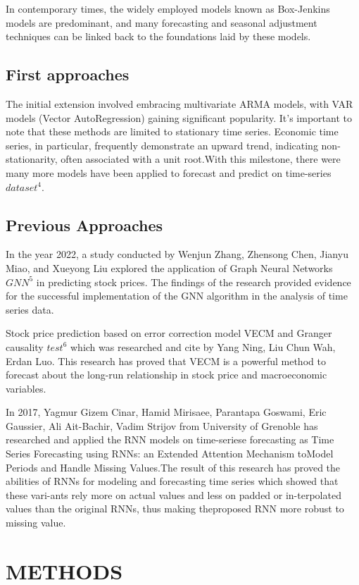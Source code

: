 \documentclass{ieeeojies}
\begin{document}
In contemporary times, the widely employed models known as Box-Jenkins models are predominant, and many forecasting and seasonal adjustment techniques can be linked back to the foundations laid by these models. 

\subsection{First approaches}
The initial extension involved embracing multivariate ARMA models, with VAR models (Vector AutoRegression) gaining significant popularity. It's important to note that these methods are limited to stationary time series. Economic time series, in particular, frequently demonstrate an upward trend, indicating non-stationarity, often associated with a unit root.With this milestone, there were many more models have been applied to forecast and predict on time-series $dataset^4$. 

\subsection{Previous Approaches}
In the year 2022, a study conducted by Wenjun Zhang, Zhensong Chen, Jianyu Miao, and Xueyong Liu explored the application of Graph Neural Networks $GNN^5$ in predicting stock prices. The findings of the research provided evidence for the successful implementation of the GNN algorithm in the analysis of time series data.

Stock price prediction based on error correction model VECM and Granger causality $test^6$ which was researched and cite by Yang Ning, Liu Chun Wah, Erdan Luo. This research has proved that VECM is a powerful method to forecast about the long-run relationship in stock price and macroeconomic variables.

In 2017, Yagmur Gizem Cinar, Hamid Mirisaee, Parantapa Goswami, Eric Gaussier, Ali Ait-Bachir, Vadim Strijov from University of Grenoble has researched and applied the RNN models on time-seriese forecasting as Time Series Forecasting using RNNs: an Extended Attention Mechanism toModel Periods and Handle Missing Values.The result of this research has proved the abilities of RNNs for modeling and forecasting time series which showed that these vari-ants rely more on actual values and less on padded or in-terpolated values than the original RNNs, thus making theproposed RNN more robust to missing value.

\section{METHODS}
\end{document}
